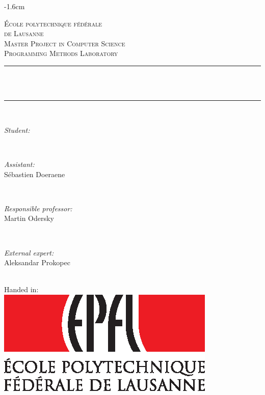 \thispagestyle{empty}

 \begin{adjustwidth*}{}{-1.6cm}

\newcommand{\HRule}{\rule{\linewidth}{0.5mm}}
\newcommand{\person}[2]{
  \begin{minipage}{0.32\textwidth}
    \begin{flushleft} \large
      \emph{#1:}\\
      #2
    \end{flushleft}
  \end{minipage}
  \\[0.7cm]
}

\center
 
\textsc{\LARGE École polytechnique fédérale\\de Lausanne}\\[1cm]
\textsc{\Large Master Project in Computer Science}\\[0.2cm]
\textsc{\large Programming Methods Laboratory }\\[0.7cm]

\HRule \\[0.5cm]
{\huge \bfseries \thetitle}\\[0.2cm]
\HRule \\[1.7cm]

\person{Student}{\theauthor}
\person{Assistant}{Sébastien Doeraene}
\person{Responsible professor}{Martin Odersky}
\person{External expert}{Aleksandar Prokopec}

\vspace{1cm}
{\large Handed in: \thedate}
\\[1.15cm]

\includegraphics{epfl.eps}

\vfill

\end{adjustwidth*}

\newpage\thispagestyle{empty}\null\newpage
